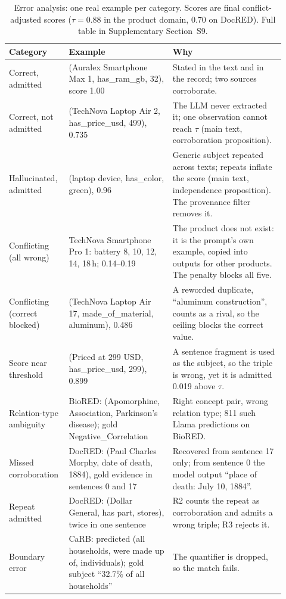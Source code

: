 \documentclass[11pt]{article}
\begin{document}
\begin{table}[htbp]
\centering
\caption{Error analysis: one real example per category. Scores are
final conflict-adjusted scores ($\tau=0.88$ in the product domain,
$0.70$ on DocRED). Full table in Supplementary Section~S9.}
\label{tab:errors}
\small
\begin{tabular}{@{}p{0.17\linewidth}p{0.36\linewidth}p{0.39\linewidth}@{}}
\toprule
Category & Example & Why \\
\midrule
Correct, admitted & (Auralex Smartphone Max 1, has\_ram\_gb, 32), score 1.00 & Stated in the text and in the record; two sources corroborate. \\
Correct, not admitted & (TechNova Laptop Air 2, has\_price\_usd, 499), 0.735 & The LLM never extracted it; one observation cannot reach $\tau$ (main text, corroboration proposition). \\
Hallucinated, admitted & (laptop device, has\_color, green), 0.96 & Generic subject repeated across texts; repeats inflate the score (main text, independence proposition). The provenance filter removes it. \\
Conflicting (all wrong) & TechNova Smartphone Pro 1: battery 8, 10, 12, 14, 18\,h; 0.14--0.19 & The product does not exist: it is the prompt's own example, copied into outputs for other products. The penalty blocks all five. \\
Conflicting (correct blocked) & (TechNova Laptop Air 17, made\_of\_material, aluminum), 0.486 & A reworded duplicate, ``aluminum construction'', counts as a rival, so the ceiling blocks the correct value. \\
Score near threshold & (Priced at 299 USD, has\_price\_usd, 299), 0.899 & A sentence fragment is used as the subject, so the triple is wrong, yet it is admitted 0.019 above $\tau$. \\
Relation-type ambiguity & BioRED: (Apomorphine, Association, Parkinson's disease); gold Negative\_Correlation & Right concept pair, wrong relation type; 811 such Llama predictions on BioRED. \\
Missed corroboration & DocRED: (Paul Charles Morphy, date of death, 1884), gold evidence in sentences 0 and 17 & Recovered from sentence 17 only; from sentence 0 the model output ``place of death: July 10, 1884''. \\
Repeat admitted & DocRED: (Dollar General, has part, stores), twice in one sentence & R2 counts the repeat as corroboration and admits a wrong triple; R3 rejects it. \\
Boundary error & CaRB: predicted (all households, were made up of, individuals); gold subject ``32.7\% of all households'' & The quantifier is dropped, so the match fails. \\
\bottomrule
\end{tabular}
\end{table}
\end{document}
